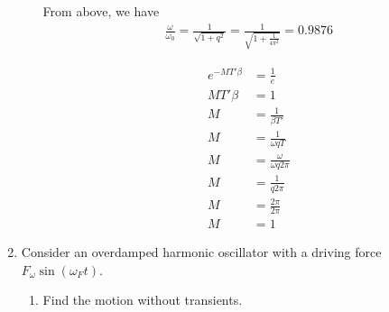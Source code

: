 \documentclass{article}
\begin{document}
\begin{enumerate}
\begin{enumerate}
        From above, we have
        \begin{align*}
            \frac{\omega}{\omega_0} = \frac{1}{\sqrt{1+q^2}} = \frac{1}{\sqrt{1+\frac{1}{4\pi^2}}} = 0.9876
        \end{align*}

        \begin{align*}
            e^{-MT'\beta} &= \frac{1}{e} \\
            MT'\beta &= 1 \\
            M &= \frac{1}{\beta T'} \\
            M &= \frac{1}{\omega q T} \\
            M &= \frac{\omega}{\omega q 2\pi} \\
            M &= \frac{1}{q 2\pi}\\
            M &= \frac{2\pi}{2\pi} \\
            M &= 1
        \end{align*}

    \end{enumerate}
    \item Consider an overdamped harmonic oscillator with a driving force $F_\omega \sin(\omega_F t)$.
    \begin{enumerate}
        \item Find the motion without transients.\\


\end{enumerate}
\end{enumerate}
\end{document}
